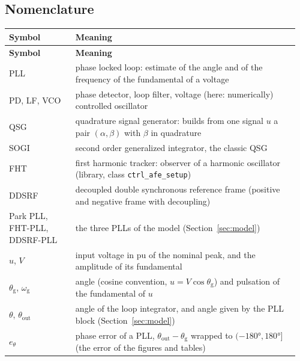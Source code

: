 \documentclass[11pt,a4paper]{scrartcl}
\newcommand{\ped}[1]{_{\mathrm{#1}}}
\newcommand{\code}[1]{\texttt{#1}}
\begin{document}


\tableofcontents
\listoffigures
\listoftables
\newpage

\begin{onehalfspace}

\section*{Nomenclature}
\label{sec:nomenclature}

\begingroup
{}
\begin{longtable}{@{} >{\raggedright\arraybackslash}p{0.22\linewidth} p{0.74\linewidth} @{}}
	\toprule
	\textbf{Symbol} & \textbf{Meaning} \\
	\midrule
	\endfirsthead
	\toprule
	\textbf{Symbol} & \textbf{Meaning} \\
	\midrule
	\endhead
	\bottomrule
	\endfoot
	\bottomrule
	\endlastfoot
	PLL & phase locked loop: estimate of the angle and of the frequency of the fundamental of a voltage \\
	PD, LF, VCO & phase detector, loop filter, voltage (here: numerically) controlled oscillator \\
	QSG & quadrature signal generator: builds from one signal $u$ a pair $(\alpha, \beta)$ with $\beta$ in quadrature \\
	SOGI & second order generalized integrator, the classic QSG \\
	FHT & first harmonic tracker: observer of a harmonic oscillator (library, class \code{ctrl\_afe\_setup}) \\
	DDSRF & decoupled double synchronous reference frame (positive and negative frame with decoupling) \\
	Park PLL, FHT-PLL, DDSRF-PLL & the three PLLs of the model (Section~\ref{sec:model}) \\
	$u$, $V$ & input voltage in pu of the nominal peak, and the amplitude of its fundamental \\
	$\theta\ped{g}$, $\omega\ped{g}$ & angle (cosine convention, $u = V\cos\theta\ped{g}$) and pulsation of the fundamental of $u$ \\
	$\theta$, $\theta\ped{out}$ & angle of the loop integrator, and angle given by the PLL block (Section~\ref{sec:model}) \\
	$e_\theta$ & phase error of a PLL, $\theta\ped{out} - \theta\ped{g}$ wrapped to $(-\ang{180}, \ang{180}]$ (the error of the figures and tables) \\

\end{longtable}
\end{onehalfspace}
\end{document}
